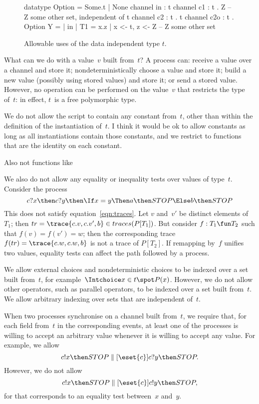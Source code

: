 
\begin{figure}[ht]
\begin{cspm}
datatype Option = Some.t | None
channel in : t
channel c1 : t . Z -- Z some other set, independent of t
channel c2 : t . t
channel c2o : t . Option
Y = {| in |}
T1 = { x.z | x <- t, z <- Z } -- Z some other set
\end{cspm}
\caption{Allowable uses of the data independent type $t$. \label{fig:t-allowed}}
\end{figure}


What can we do with a value~$v$ built from~$t$?  A process can: receive a
value over a channel and store it; nondeterministically choose a value and
store it; build a new value (possibly using stored values) and store it; or
send a stored value.  However, no operation can be performed on the value~$v$
that restricts the type of~$t$: in effect, $t$~is a free polymorphic type.

We do not allow the script to contain any constant from~$t$, other than within
the definition of the instantiation of~$t$.  \framebox{**} I
think it would be ok to allow constants as long as all instantiations contain
those constants, and we restrict to functions that are the identity on each
constant. 

Also not functions like  \framebox{\ldots}

We also do not allow any equality or inequality tests over values of type~$t$.
Consider the process
\[
c?x \then c?y \then \If x = y \Then a \then STOP \Else b \then STOP
\]
%
This does not satisfy equation~\ref{eqn:traces}.  Let $v$ and~$v'$ be distinct
elements of~$T_1$; then $tr = \trace{c.v, c.v', b} \in traces(P[T_1])$.  But
consider $f: T_1 \fun T_2$ such that $f(v) = f(v') = w$; then the
corresponding trace $f(tr) = \trace{c.w, c.w, b}$ is not a trace of
$P[T_2]$.  If remapping by~$f$ unifies two values, equality tests can affect
the path followed by a process. 

We allow external choices and nondeterministic choices to be indexed over a
set built from~$t$, for example~$\Intchoice x \in t \spot P(x)$.  However, we
do not allow other operators, such as parallel operators, to be indexed over a
set built from~$t$.  We allow arbitrary indexing over sets that are
independent of~$t$. 

When two processes synchronise on a channel built from~$t$, we require that,
for each field from~$t$ in the corresponding events, at least one of the
processes is willing to accept an arbitrary value whenever it is willing to
accept any value.  For example, we allow
\[
c!x \then STOP \parallel[\eset{c}] c?y \then STOP.
\]
However, we do not allow 
\[
c!x \then STOP \parallel[\eset{c}] c!y \then STOP,
\]
for that corresponds to an equality test between~$x$ and~$y$. 

